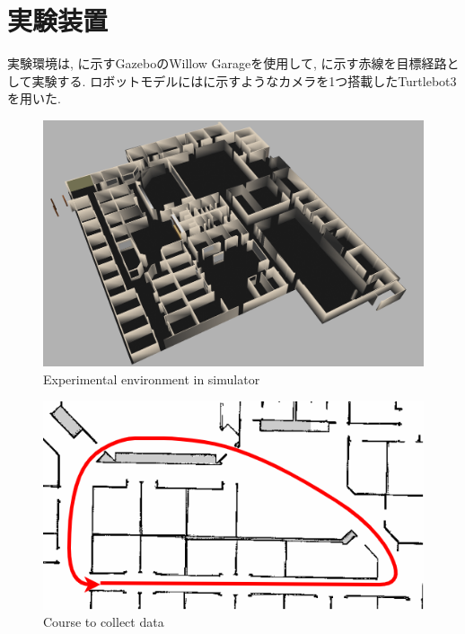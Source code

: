\section{実験装置}
実験環境は, に示すGazebo\cite{gazebo}のWillow Garage\cite{willow}を使用して, に示す赤線を目標経路として実験する. ロボットモデルにはに示すようなカメラを1つ搭載したTurtlebot3\cite{turtlebot3}を用いた. 

\newpage
\begin{figure}[h]
  \centering
  \includegraphics[keepaspectratio, scale=0.13]{images/willow.png}
  \caption{Experimental environment in simulator}
  \label{Fig:gazebo}
  \end{figure}

\begin{figure}[h]
  \centering
  \includegraphics[keepaspectratio, scale=0.35]{images/willow-path.png}
  \caption{Course to collect data}
  \label{Fig:willow-garage}
  \end{figure}

